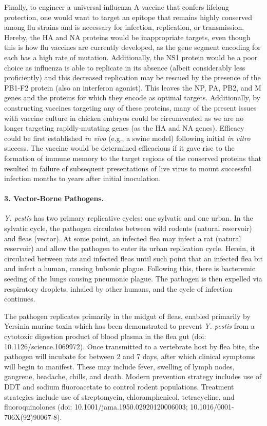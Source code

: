 \documentclass[11pt,letterpaper,final] {article}
\begin{document}
Finally, to engineer a universal influenza A vaccine that confers lifelong protection, one would want to target an epitope that remains highly conserved among flu strains and is necessary for infection, replication, or transmission. Hereby, the HA and NA proteins would be inappropriate targets, even though this is how flu vaccines are currently developed, as the gene segment encoding for each has a high rate of mutation. Additionally, the NS1 protein would be a poor choice as influenza is able to replicate in its absence (albeit considerably less proficiently) and this decreased replication may be rescued by the presence of the PB1-F2 protein (also an interferon agonist). This leaves the NP, PA, PB2, and M genes and the proteins for which they encode as optimal targets. Additionally, by constructing vaccines targeting any of these proteins, many of the present issues with vaccine culture in chicken embryos could be circumvented as we are no longer targeting rapidly-mutating genes (as the HA and NA genes). Efficacy could be first established \textit{in vivo} (e.g., a swine model) following initial \textit{in vitro} success. The vaccine would be determined efficacious if it gave rise to the formation of immune memory to the target regions of the conserved proteins that resulted in failure of subsequent presentations of live virus to mount successful infection months to years after initial inoculation.

\paragraph{3. Vector-Borne Pathogens.} \textit{Y. pestis} has two primary replicative cycles: one sylvatic and one urban. In the sylvatic cycle, the pathogen circulates between wild rodents (natural reservoir) and fleas (vector). At some point, an infected flea may infect a rat (natural reservoir) and allow the pathogen to enter its urban replication cycle. Herein, it circulated between rats and infected fleas until such point that an infected flea bit and infect a human, causing bubonic plague. Following this, there is bacteremic seeding of the lungs causing pneumonic plague. The pathogen is then expelled via respiratory droplets, inhaled by other humans, and the cycle of infection continues.

The pathogen replicates primarily in the midgut of fleas, enabled primarily by Yersinia murine toxin which has been demonstrated to prevent \textit{Y. pestis} from a cytotoxic digestion product of blood plasma in the flea gut (doi: 10.1126/science.1069972). Once transmitted to a vertebrate host by flea bite, the pathogen will incubate for between 2 and 7 days, after which clinical symptoms will begin to manifest. These may include fever, swelling of lymph nodes, gangrene, headache, chills, and death. Modern prevention strategy includes use of DDT and sodium fluoroacetate to control rodent populations. Treatment strategies include use of streptomycin, chloramphenicol, tetracycline, and fluoroquinolones (doi: 10.1001/jama.1950.02920120006003; 10.1016/0001-706X(92)90067-8).
\end{document}
